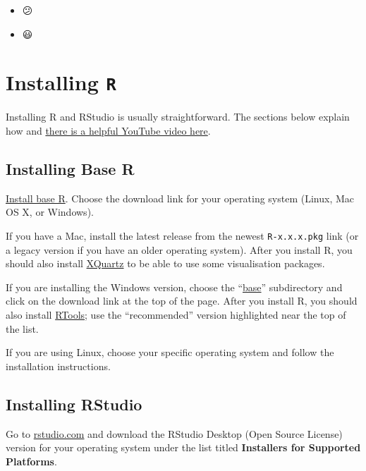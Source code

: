 \documentclass[
  oneside]{book}
\begin{document}
\begin{itemize}
\item
  😕
\item
  😃
\end{itemize}

\hypertarget{appendix-appendices}{%
\appendix}


\hypertarget{installing-r}{%
\chapter{\texorpdfstring{Installing \texttt{R}}{Installing R}}\label{installing-r}}

Installing R and RStudio is usually straightforward. The sections below explain how and \href{https://www.youtube.com/watch?v=lVKMsaWju8w}{there is a helpful YouTube video here}.

\hypertarget{installing-base-r}{%
\section{Installing Base R}\label{installing-base-r}}

\href{https://cran.rstudio.com/}{Install base R}. Choose the download link for your operating system (Linux, Mac OS X, or Windows).

If you have a Mac, install the latest release from the newest \texttt{R-x.x.x.pkg} link (or a legacy version if you have an older operating system). After you install R, you should also install \href{http://xquartz.macosforge.org/}{XQuartz} to be able to use some visualisation packages.

If you are installing the Windows version, choose the ``\href{https://cran.rstudio.com/bin/windows/base/}{base}'' subdirectory and click on the download link at the top of the page. After you install R, you should also install \href{https://cran.rstudio.com/bin/windows/Rtools/}{RTools}; use the ``recommended'' version highlighted near the top of the list.

If you are using Linux, choose your specific operating system and follow the installation instructions.

\hypertarget{installing-rstudio}{%
\section{Installing RStudio}\label{installing-rstudio}}

Go to \href{https://www.rstudio.com/products/rstudio/download/\#download}{rstudio.com} and download the RStudio Desktop (Open Source License) version for your operating system under the list titled \textbf{Installers for Supported Platforms}.
\end{document}
